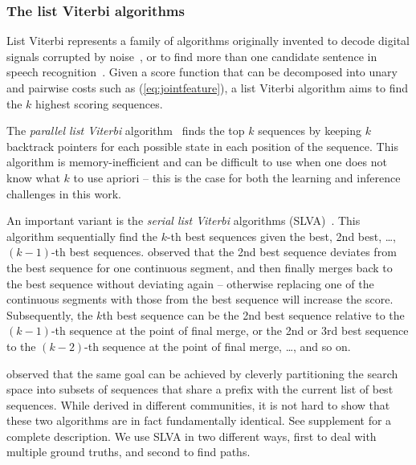 
\subsubsection{The list Viterbi algorithms}
List Viterbi represents a family of algorithms originally invented to decode digital signals corrupted by noise~\cite{seshadri1994list,nill1995list}, or to find more than one candidate sentence in speech recognition~\cite{soong1991tree}. Given a score function that can be decomposed into unary and pairwise costs such as (\ref{eq:jointfeature}), a list Viterbi algorithm aims to find the $k$ highest scoring sequences. %

The \emph{parallel list Viterbi} algorithm~\cite{seshadri1994list} finds the top $k$ sequences
by keeping $k$ backtrack pointers for each possible state in each position of the sequence.
This algorithm is memory-inefficient and can be difficult to use when one does not know what $k$ to use apriori -- this is the case for both the learning and inference challenges in this work.

An important variant is the \emph{serial list Viterbi} algorithms (SLVA)~\cite{seshadri1994list,nill1995list,nilsson2001sequentially}.
This algorithm sequentially find the $k$-th best sequences given the best, 2nd best, \dots, $(k \!-\! 1)$-th best sequences.
\citet{seshadri1994list} observed 
that the 2nd best sequence deviates from the best sequence
for one continuous segment, and then finally merges back to the best sequence without deviating again
-- otherwise replacing one of the continuous segments with those from the best sequence will increase the score.
Subsequently, the $k$th best sequence can be the 2nd best sequence relative to the $(k \!-\! 1)$-th sequence
at the point of final merge, or the 2nd or 3rd best sequence to the $(k \!-\! 2)$-th sequence at the point of final merge, \ldots, and so on. 

\citet{nilsson2001sequentially} observed that the same goal can be achieved by cleverly partitioning the search space into subsets of sequences that share a prefix with the current list of best sequences. While derived in different communities, it is not hard to show that these two algorithms are in fact fundamentally identical.
See supplement for a complete description.
We use SLVA in two different ways, first to deal with multiple ground truths, and second to find paths.

